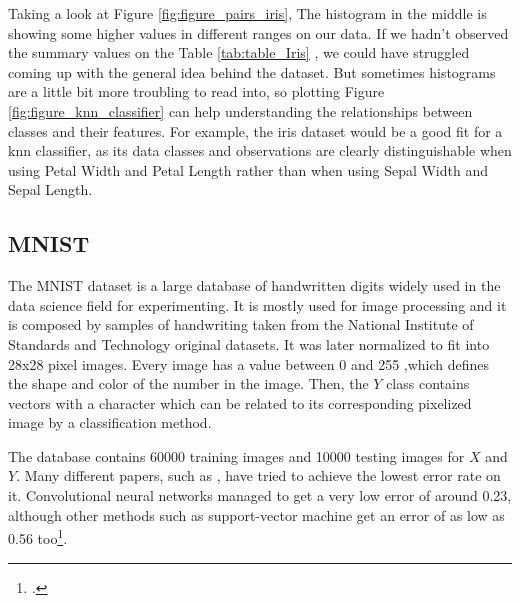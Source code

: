 Taking a look at Figure \ref{fig:figure_pairs_iris}, The histogram in the middle is showing some higher values in different ranges on our data. If we hadn't observed the summary values on the Table \ref{tab:table_Iris} , we could have struggled coming up with the general idea behind the dataset. But sometimes histograms are a little bit more troubling to read into, so plotting Figure \ref{fig:figure_knn_classifier} can help understanding the relationships between classes and their features. For example, the iris dataset would be a good fit for a knn classifier, as its data classes and observations are clearly distinguishable when using Petal Width and Petal Length rather than when using Sepal Width and Sepal Length. \par

\subsection{MNIST}

The MNIST dataset is a large database of handwritten digits widely used in the data science field for experimenting. It is mostly used for image processing and it is composed by samples of handwriting taken from the National Institute of Standards and Technology original datasets. It was later normalized to fit into 28x28 pixel images. Every image has a value between 0 and 255 ,which defines the shape and color of the number in the image. Then, the $Y$ class contains vectors with a character which can be related to its corresponding pixelized image by a classification method. \par

The database contains 60000 training images and 10000 testing images for $X$ and $Y$. Many different papers, such as \cite{MNIST_classification_example}, have tried to achieve the lowest error rate on it. Convolutional neural networks managed to get a very low error of around 0.23, although other methods such as support-vector machine get an error of as low as 0.56 too\footcite{wiki:MNIST}.\par

